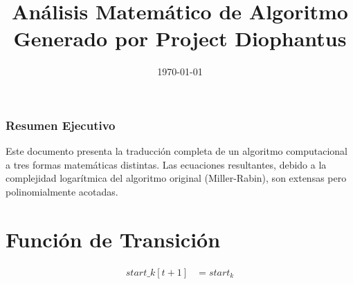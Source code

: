\documentclass[10pt, a4paper]{article}
\title{Análisis Matemático de Algoritmo \\ \large Generado por Project Diophantus}
\author{}
\date{\today}
\begin{document}
\maketitle
\section*{Resumen Ejecutivo}
Este documento presenta la traducción completa de un algoritmo computacional a tres formas matemáticas distintas.
Las ecuaciones resultantes, debido a la complejidad logarítmica del algoritmo original (Miller-Rabin), son extensas pero polinomialmente acotadas.
\part{Función de Transición}
\begin{align*}
start\_k[t+1] &= start_k \\

\end{align*}
\end{document}
